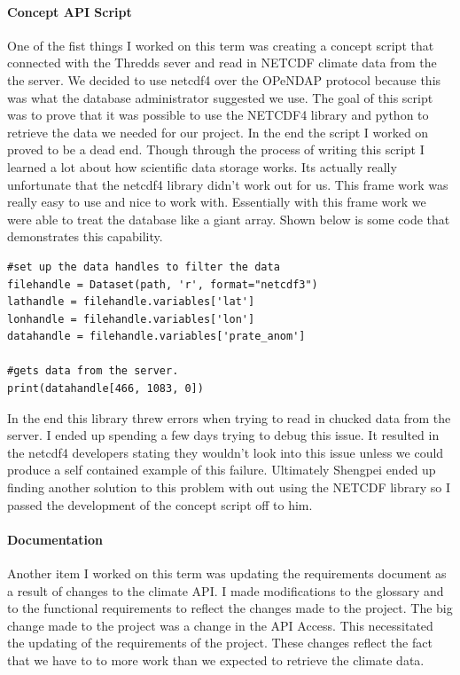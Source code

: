 \documentclass[onecolumn, draftclsnofoot,10pt, compsoc]{article}
\begin{document}
		\paragraph{Concept API Script} \hfill \break
		One of the fist things I worked on this term was creating a concept script that connected with the Thredds sever and read in NETCDF climate data from the the server. We decided to use netcdf4 over the OPeNDAP protocol because this was what the database administrator suggested we use. The goal of this script was to prove that it was possible to use the NETCDF4 library and python to retrieve the data we needed for our project. In the end the script I worked on proved to be a dead end. Though through the process of writing this script I learned a lot about how scientific data storage works. Its actually really unfortunate that the netcdf4 library didn't work out for us. This frame work was really easy to use and nice to work with. Essentially with this frame work we were able to treat the database like a giant array. Shown below is some code that demonstrates this capability.\\

\begin{lstlisting}
#set up the data handles to filter the data
filehandle = Dataset(path, 'r', format="netcdf3")
lathandle = filehandle.variables['lat']
lonhandle = filehandle.variables['lon']
datahandle = filehandle.variables['prate_anom']

#gets data from the server.
print(datahandle[466, 1083, 0])
\end{lstlisting}
		
In the end this library threw errors when trying to read in chucked data from the server. I ended up spending a few days trying to debug this issue. It resulted in the netcdf4 developers stating they wouldn't look into this issue unless we could produce a self contained example of this failure. Ultimately Shengpei ended up finding another solution to this problem with out using the NETCDF library so I passed the development of the concept script off to him.\\

		\paragraph{Documentation} \hfill \break
		Another item I worked on this term was updating the requirements document as a result of changes to the climate API. I made modifications to the glossary and to the functional requirements to reflect the changes made to the project. The big change made to the project was a change in the API Access. This necessitated the updating of the requirements of the project. These changes reflect the fact that we have to to more work than we expected to retrieve the climate data.\\
\end{document}
